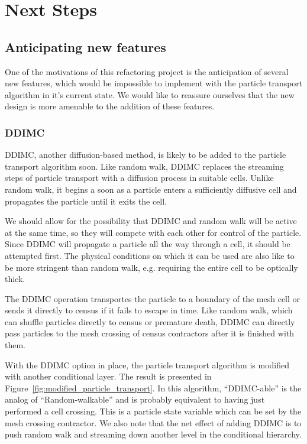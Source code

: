\documentclass[memo]{ResearchNote}
\begin{document}
\section{Next Steps}

\subsection{Anticipating new features}

One of the motivations of this refactoring project is the anticipation
of several new features, which would be impossible to implement with
the particle transport algorithm in it's current state. We would like
to reassure ourselves that the new design is more amenable to the
addition of these features. 

\subsubsection{DDIMC} \label{sec:DDIMC}

DDIMC, another diffusion-based method, is likely to be added to the
particle transport algorithm soon. Like random walk, DDIMC replaces
the streaming steps of particle transport with a diffusion process in
suitable cells. Unlike random walk, it begins a soon as a particle
enters a sufficiently diffusive cell and propagates the particle until
it exits the cell.

We should allow for the possibility that DDIMC and random walk will be
active at the same time, so they will compete with each other for
control of the particle. Since DDIMC will propagate a particle all the
way through a cell, it should be attempted first. The physical
conditions on which it can be used are also like to be more stringent
than random walk, e.g. requiring the entire cell to be optically
thick.

The DDIMC operation transportes the particle to a boundary of the mesh
cell or sends it directly to census if it fails to escape in time.
Like random walk, which can shuffle particles directly to census or
premature death, DDIMC can directly pass particles to the mesh
crossing of census contractors after it is finished with them.

With the DDIMC option in place, the particle transport algorithm is
modified with another conditional layer. The result is presented in
Figure~\ref{fig:modified_particle_transport}. In this algorithm,
``DDIMC-able'' is the analog of ``Random-walkable'' and is probably
equivalent to having just performed a cell crossing. This is a
particle state variable which can be set by the mesh crossing
contractor. We also note that the net effect of adding DDIMC is to
push random walk and streaming down another level in the conditional
hierarchy.
\end{document}
